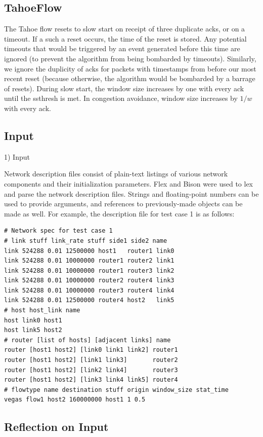 \documentclass[12pt]{article}
\begin{document}
\subsection{TahoeFlow}
The Tahoe flow resets to slow start on receipt of three duplicate acks, or on a timeout.  If a such a reset occurs, the time of the reset is stored.  Any potential timeouts that would be triggered by an event generated before this time are ignored (to prevent the algorithm from being bombarded by timeouts).  Similarly, we ignore the duplicity of acks for packets with timestamps from before our most recent reset (because otherwise, the algorithm would be bombarded by a barrage of resets).  During slow start, the window size increases by one with every ack until the ssthresh is met.  In congestion avoidance, window size increases by $1/w$ with every ack.

\subsection{Input}
1) Input

Network description files consist of plain-text listings of various network components and their initialization parameters. Flex and Bison were used to lex and parse the network description files. Strings and floating-point numbers can be used to provide arguments, and references to previously-made objects can be made as well. For example, the description file for test case 1 is as follows:
\begin{verbatim}
# Network spec for test case 1
# link stuff link_rate stuff side1 side2 name
link 524288 0.01 12500000 host1   router1 link0
link 524288 0.01 10000000 router1 router2 link1
link 524288 0.01 10000000 router1 router3 link2
link 524288 0.01 10000000 router2 router4 link3
link 524288 0.01 10000000 router3 router4 link4
link 524288 0.01 12500000 router4 host2   link5
# host host_link name
host link0 host1
host link5 host2
# router [list of hosts] [adjacent links] name
router [host1 host2] [link0 link1 link2] router1
router [host1 host2] [link1 link3]       router2
router [host1 host2] [link2 link4]       router3
router [host1 host2] [link3 link4 link5] router4
# flowtype name destination stuff origin window_size stat_time
vegas flow1 host2 160000000 host1 1 0.5
\end{verbatim}

\subsection*{Reflection on Input}
\end{document}
